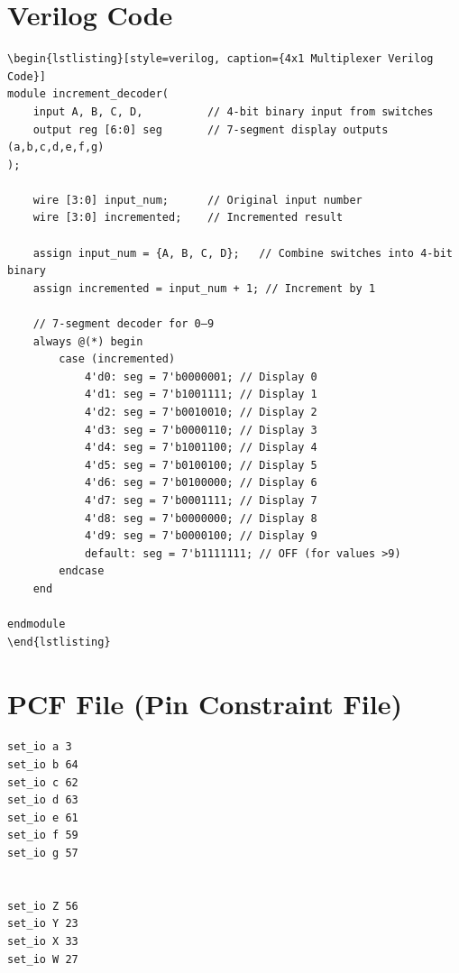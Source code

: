 \documentclass[a4paper,12pt]{article}
\begin{document}
\section*{Verilog Code}
\begin{verbatim}
\begin{lstlisting}[style=verilog, caption={4x1 Multiplexer Verilog Code}]
module increment_decoder(
    input A, B, C, D,          // 4-bit binary input from switches
    output reg [6:0] seg       // 7-segment display outputs (a,b,c,d,e,f,g)
);

    wire [3:0] input_num;      // Original input number
    wire [3:0] incremented;    // Incremented result

    assign input_num = {A, B, C, D};   // Combine switches into 4-bit binary
    assign incremented = input_num + 1; // Increment by 1

    // 7-segment decoder for 0–9
    always @(*) begin
        case (incremented)
            4'd0: seg = 7'b0000001; // Display 0
            4'd1: seg = 7'b1001111; // Display 1
            4'd2: seg = 7'b0010010; // Display 2
            4'd3: seg = 7'b0000110; // Display 3
            4'd4: seg = 7'b1001100; // Display 4
            4'd5: seg = 7'b0100100; // Display 5
            4'd6: seg = 7'b0100000; // Display 6
            4'd7: seg = 7'b0001111; // Display 7
            4'd8: seg = 7'b0000000; // Display 8
            4'd9: seg = 7'b0000100; // Display 9
            default: seg = 7'b1111111; // OFF (for values >9)
        endcase
    end

endmodule
\end{lstlisting}
\end{verbatim}

\section*{PCF File (Pin Constraint File)}
\begin{lstlisting}[style=verilog, caption={.pcf File for Vaman Board Pin Mapping}]
set_io a 3
set_io b 64
set_io c 62
set_io d 63
set_io e 61
set_io f 59
set_io g 57


set_io Z 56
set_io Y 23
set_io X 33
set_io W 27
\end{lstlisting}
\end{document}

